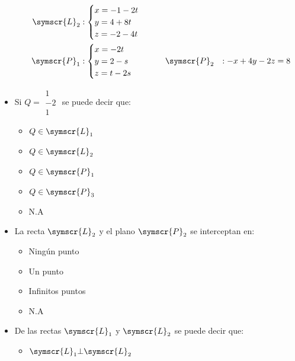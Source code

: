 \documentclass{article}
\def\fancyL{\symscr{L}}
\def\fancyP{\symscr{P}}
\begin{document}
\begin{enumerate}
\[\begin{aligned}
            \hspace{1cm}
            \fancyL_2 &: 
            \begin{cases}
                x = -1 -2t \\
                y = 4 +8t \\ 
                z = -2 -4t \\
            \end{cases} \\
            \fancyP_1 &:
            \begin{cases}
                x = -2t \\
                y = 2 - s \\
                z = t - 2s
            \end{cases}
            \hspace{1cm}
            \fancyP_2 &: -x + 4y - 2z = 8
        \end{aligned}
    \]
    \begin{itemize}
        \item Si \(Q = \begin{smallmatrix}1 \\ −2 \\ 1\end{smallmatrix}\) se puede decir que:
            \begin{itemize}
                \item \(Q \in \fancyL_1\)
                \item \(Q \in \fancyL_2\)
                \item \(Q \in \fancyP_1\)
                \item \(Q \in \fancyP_3\)
                \item N.A
            \end{itemize}
        \item La recta \(\fancyL_2\) y el plano \(\fancyP_2\) se interceptan en:
            \begin{itemize}
				\item Ningún punto
				\item Un punto
				\item Infinitos puntos
				\item N.A
            \end{itemize}
        \item De las rectas \(\fancyL_1\) y \(\fancyL_2\) se puede decir que:
            \begin{itemize}
                \item \(\fancyL_1 \bot \fancyL_2\)

\end{itemize}
\end{itemize}
\end{enumerate}
\end{document}
